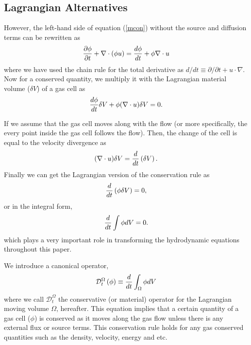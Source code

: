 \documentclass[twocolumn]{aastex63}
\newcommand{\vel}{{u}}
\begin{document}
\subsection{Lagrangian Alternatives}
However, the left-hand side of equation (\ref{mcon}) without the source and diffusion terms can be rewritten as
\begin{equation}
	{\partial \phi\over \partial t} +\nabla\cdot\left(\phi \vel\right) = {d\phi\over dt} + \phi \nabla\cdot \vel 
\end{equation}
where we have used the chain rule for the total derivative as $d/dt\equiv \partial/\partial t + \vel\cdot\nabla$. Now for a conserved quantity, we multiply it with the Lagrangian material volume ($\delta V$) of a gas cell as
\begin{equation}
	{d\phi\over dt} \delta V + \phi (\nabla\cdot\vel) \delta V = 0.
\end{equation}


If we assume that the gas cell moves along with the flow (or more specifically, the every point inside the gas cell follows the flow). Then, the change of the cell is equal to the velocity divergence as 
\begin{equation}
	(\nabla\cdot\vel)\delta V = {d\over dt}\left(\delta V\right).
\end{equation} Finally we can get the Lagrangian version of the conservation rule as
\begin{equation}
	{d \over dt}\left( \phi \delta V\right)  = 0,
\end{equation}
or in the integral form,
\begin{equation}
	{d\over dt} \int\phi  d V = 0.
\end{equation}
which plays a very important role in transforming the hydrodynamic equations throughout this paper.

We introduce a canonical operator,
\begin{equation}
	\mathcal{D}_t^\Omega \left( {  \phi }\right) \equiv {d\over dt} \int_\Omega {  \phi d V} 
\end{equation}
where we call $\mathcal{D}_t^\Omega$ the conservative (or material) operator for the Lagrangian moving volume $\Omega$, hereafter. This equation implies that a certain quantity of a gas cell ($\phi$) is conserved as it moves along the gas flow unless there is any  external flux or source terms. This conservation rule holds for any gas conserved quantities such as the density, velocity, energy and etc. 
\end{document}
